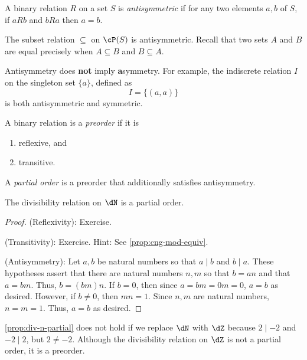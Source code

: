 \documentclass{amsart}
\begin{document}
\begin{defn}[Antisymmetry]
  A binary relation $R$ on a set $S$ is \emph{antisymmetric} if for any two elements $a, b$ of $S$, if $aRb$ and $bRa$ then $a = b$.
\end{defn}

\begin{eg}
  The subset relation $\subseteq$ on $\cP(S)$ is antisymmetric.
  Recall that two sets $A$ and $B$ are equal precisely when $A \subseteq B$ and $B \subseteq A$.
\end{eg}

\begin{rmk}
  Antisymmetry does \textbf{not} imply \textbf{a}symmetry.
  For example, the indiscrete relation $I$ on the singleton set $\{a\}$, defined as
  \[
    I = \{(a,a)\}
  \]
  is both antisymmetric and symmetric.
\end{rmk}

\begin{defn}[Preorder]
  A binary relation is a \emph{preorder} if it is
  \begin{enumerate}
  \item reflexive, and
  \item transitive.
  \end{enumerate}
\end{defn}

\begin{defn}
  A \emph{partial order} is a preorder that additionally satisfies antisymmetry.
\end{defn}

\begin{prop}\label{prop:div-n-partial}
  The divisibility relation on $\dN$ is a partial order.
\end{prop}
\begin{proof}
  (Reflexivity): Exercise.

  (Transitivity): Exercise.
  Hint: See \cref{prop:cng-mod-equiv}.

  (Antisymmetry): Let $a, b$ be natural numbers so that $a \mid b$ and $b \mid a$.
  These hypotheses assert that there are natural numbers $n, m$ so that $b = an$ and that $a = bm$.
  Thus, $b = (bm)n$.
  If $b = 0$, then since $a = bm = 0m = 0$, $a = b$ as desired.
  However, if $b \ne 0$, then $mn = 1$.
  Since $n, m$ are natural numbers, $n = m = 1$.
  Thus, $a = b$ as desired.
\end{proof}

\begin{rmk}
  \cref{prop:div-n-partial} does not hold if we replace $\dN$ with $\dZ$ because $2 \mid -2$ and $-2 \mid 2$, but $2 \ne -2$.
  Although the divisibility relation on $\dZ$ is not a partial order, it is a preorder.
\end{rmk}
\end{document}
